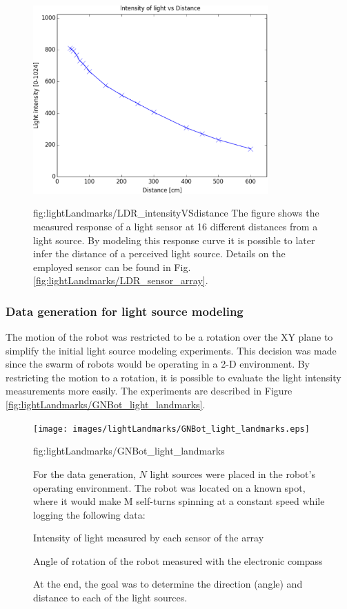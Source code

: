 \begin{figure}[h!]
\centerline{\mbox{\includegraphics[width=9cm]{images/lightLandmarks/LDR_intensityVSdistance.eps}}}
{fig:lightLandmarks/LDR_intensityVSdistance}{
The figure shows the measured response of a light sensor at 16 different distances from a light source.
By modeling this response curve it is possible to later infer the distance of a perceived light source.
Details on the employed sensor can be found in Fig. \ref{fig:lightLandmarks/LDR_sensor_array}.
}\end{figure}







\subsubsection{Data generation for light source modeling}


The motion of the robot was restricted to be a rotation over the XY plane to simplify the initial light source modeling experiments. This decision was made since the swarm of robots would be operating in a 2-D environment. By restricting the motion to a rotation, it is possible to evaluate the light intensity measurements more easily. The experiments are described in Figure \ref{fig:lightLandmarks/GNBot_light_landmarks}.

\begin{figure}[h!]
\centerline{\mbox{\texttt{[image: images/lightLandmarks/GNBot\_light\_landmarks.eps]}}}
{fig:lightLandmarks/GNBot_light_landmarks}{
For the data generation, $N$ light sources were placed in the robot's operating environment. The robot was located on a known spot, where it would make M self-turns spinning at a constant speed while logging the following data:
\vspace{-0.3cm}
\begin{packed_enum}
	\item Intensity of light measured by each sensor of the array
	\item Angle of rotation of the robot measured with the electronic compass
\end{packed_enum}
\vspace{-0.3cm}
At the end, the goal was to determine the direction (angle) and distance to each of the light sources.
}\end{figure}



